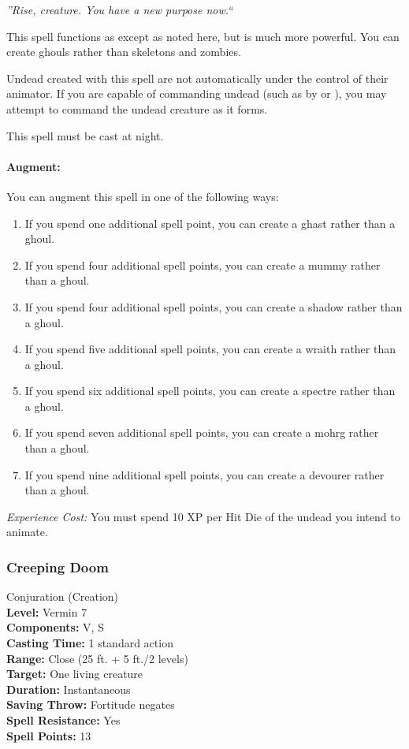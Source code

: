 \emph{''Rise, creature. You have a new purpose now.``}

This spell functions as  except as noted here, but is much more powerful. You can create ghouls rather than skeletons and zombies.

Undead created with this spell are not automatically under the control of their animator.
If you are capable of commanding undead (such as by  or ), you may attempt to command the undead creature as it forms.

This spell must be cast at night. 

\paragraph{Augment:} You can augment this spell in one of the following ways:
\begin{enumerate}
 \item If you spend one additional spell point, you can create a ghast rather than a ghoul.
 \item If you spend four additional spell points, you can create a mummy rather than a ghoul.
 \item If you spend four additional spell points, you can create a shadow rather than a ghoul.
 \item If you spend five additional spell points, you can create a wraith rather than a ghoul.
 \item If you spend six additional spell points, you can create a spectre rather than a ghoul.
 \item If you spend seven additional spell points, you can create a mohrg rather than a ghoul.
 \item If you spend nine additional spell points, you can create a devourer rather than a ghoul.
\end{enumerate}

\emph{Experience Cost:} You must spend 10 XP per Hit Die of the undead you intend to animate.

\subsubsection{Creeping Doom}
\label{Spell:CreepingDoom}
Conjuration (Creation)
\\ \textbf{Level:} Vermin 7
\\ \textbf{Components:} V, S
\\ \textbf{Casting Time:} 1 standard action
\\ \textbf{Range:} Close (25 ft. + 5 ft./2 levels)
\\ \textbf{Target:} One living creature
\\ \textbf{Duration:} Instantaneous
\\ \textbf{Saving Throw:} Fortitude negates
\\ \textbf{Spell Resistance:} Yes
\\ \textbf{Spell Points:} 13

